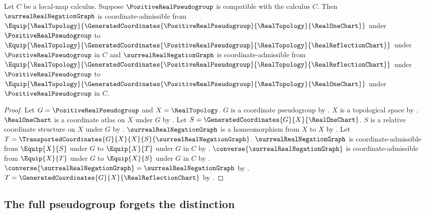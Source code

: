 \begin{theorem}\label{real_reflection_transported_admissible}
    Let $C$ be a local-map calculus.
    Suppose $\PositiveRealPseudogroup$ is compatible with the calculus $C$.
    Then $\surrealRealNegationGraph$ is coordinate-admissible
        from $\Equip{\RealTopology}{\GeneratedCoordinates{\PositiveRealPseudogroup}{\RealTopology}{\RealOneChart}}$
        under $\PositiveRealPseudogroup$
        to $\Equip{\RealTopology}{\GeneratedCoordinates{\PositiveRealPseudogroup}{\RealTopology}{\RealReflectionChart}}$
        under $\PositiveRealPseudogroup$ in $C$ and
        $\surrealRealNegationGraph$ is coordinate-admissible
        from $\Equip{\RealTopology}{\GeneratedCoordinates{\PositiveRealPseudogroup}{\RealTopology}{\RealReflectionChart}}$
        under $\PositiveRealPseudogroup$
        to $\Equip{\RealTopology}{\GeneratedCoordinates{\PositiveRealPseudogroup}{\RealTopology}{\RealOneChart}}$
        under $\PositiveRealPseudogroup$ in $C$.
\end{theorem}
\begin{proof}
    Let $G=\PositiveRealPseudogroup$ and $X=\RealTopology$.
    $G$ is a coordinate pseudogroup by .
    $X$ is a topological space by .
    $\RealOneChart$ is a coordinate atlas on $X$ under $G$ by .
    Let $S=\GeneratedCoordinates{G}{X}{\RealOneChart}$.
    $S$ is a relative coordinate structure on $X$ under $G$ by .
    $\surrealRealNegationGraph$ is a homeomorphism from $X$ to $X$ by .
    Let $T=\TransportedCoordinates{G}{X}{X}{S}{\surrealRealNegationGraph}$.
    $\surrealRealNegationGraph$ is coordinate-admissible from $\Equip{X}{S}$ under $G$
        to $\Equip{X}{T}$ under $G$ in $C$ by .
    $\converse{\surrealRealNegationGraph}$ is coordinate-admissible from $\Equip{X}{T}$ under $G$
        to $\Equip{X}{S}$ under $G$ in $C$ by .
    $\converse{\surrealRealNegationGraph}=\surrealRealNegationGraph$ by .
    $T=\GeneratedCoordinates{G}{X}{\RealReflectionChart}$ by
        .
\end{proof}

\subsection{The full pseudogroup forgets the distinction}

